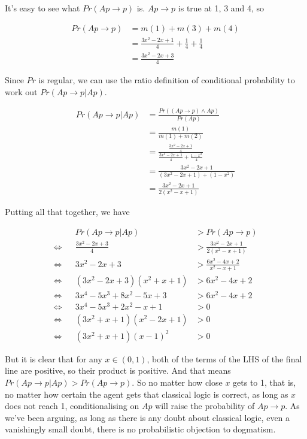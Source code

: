 \documentclass[
  11pt,
  letterpaper,
  DIV=11,
  numbers=noendperiod,
  oneside]{scrartcl}
\begin{document}
It's easy to see what \(Pr(Ap \rightarrow p)\) is. \(Ap \rightarrow p\)
is true at 1, 3 and 4, so

\[\begin{aligned}
Pr(Ap \rightarrow p) &= m({1}) + m({3}) + m(4) \\
 &= \frac{3x^2 - 2x + 1}{4} + \frac{1}{4} + \frac{1}{4} \\
 &= \frac{3x^2 - 2x + 3}{4} \end{aligned}\]

Since \(Pr\) is regular, we can use the ratio definition of conditional
probability to work out \(Pr(Ap \rightarrow p | Ap)\).

\[\begin{aligned}
Pr(Ap \rightarrow p | Ap) &= \frac{Pr((Ap \rightarrow p) \wedge Ap)}{Pr(Ap)} \\
 &= \frac{m({1})}{m({1}) + m({2})} \\
 &= \frac{\frac{3x^2 - 2x + 1}{4}}{\frac{3x^2 - 2x + 1}{4} + \frac{1-x^2}{4}} \\
 &= \frac{3x^2 - 2x + 1}{(3x^2 - 2x + 1) + (1-x^2)} \\
 &= \frac{3x^2 - 2x + 1}{2(x^2 - x + 1)} \end{aligned}\]

Putting all that together, we have

\[\begin{aligned}
&& Pr(Ap \rightarrow p | Ap) &> Pr(Ap \rightarrow p) \\
\Leftrightarrow &&  \frac{3x^2 - 2x + 3}{4}  &> \frac{3x^2 - 2x + 1}{2(x^2 - x + 1)} \\
\Leftrightarrow && 3x^2 - 2x + 3  &> \frac{6x^2 - 4x + 2}{x^2 - x + 1} \\
\Leftrightarrow && (3x^2 - 2x + 3)(x^2 + x + 1)  &> 6x^2 - 4x + 2 \\
\Leftrightarrow && 3x^4 - 5x^3 + 8x^2 - 5x + 3  &> 6x^2 - 4x + 2 \\
\Leftrightarrow && 3x^4 - 5x^3 + 2x^2 - x + 1 &> 0 \\
\Leftrightarrow && (3x^2 + x + 1)(x^2 - 2x + 1) &> 0 \\
\Leftrightarrow && (3x^2 + x + 1)(x - 1)^2 &> 0\end{aligned}\]

But it is clear that for any \(x \in (0,1)\), both of the terms of the
LHS of the final line are positive, so their product is positive. And
that means \(Pr(Ap \rightarrow p | Ap) > Pr(Ap \rightarrow p)\). So no
matter how close \(x\) gets to 1, that is, no matter how certain the
agent gets that classical logic is correct, as long as \(x\) does not
reach 1, conditionalising on \(Ap\) will raise the probability of
\(Ap \rightarrow p\). As we've been arguing, as long as there is any
doubt about classical logic, even a vanishingly small doubt, there is no
probabilistic objection to dogmatism.
\end{document}
